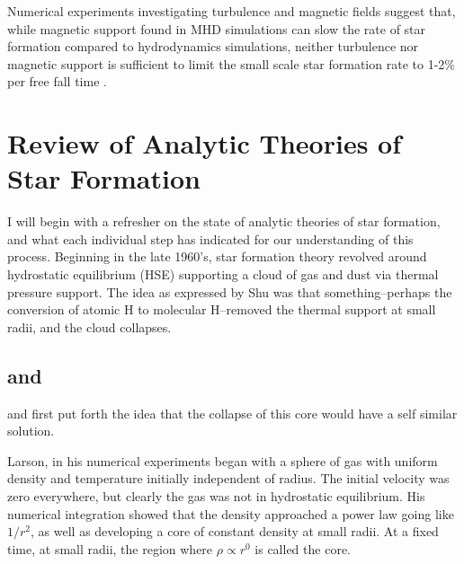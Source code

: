 \documentclass[../dissertation.tex]{subfiles}
\begin{document}

Numerical experiments investigating turbulence and magnetic fields suggest that, while magnetic support found in MHD simulations can slow the rate of star formation 
compared to hydrodynamics simulations, neither turbulence nor magnetic support is sufficient to limit the small scale star formation rate to 1-2\% per free fall time
\citep{2010ApJ...709...27W,2011MNRAS.410L...8C,2011ApJ...730...40P,2012ApJ...754...71K,2014MNRAS.439.3420M,2015ApJ...808...48B,2017ApJ...838...40M}.

\section{Review of Analytic Theories of Star Formation} \label{sec:sf_review}
I will begin with a refresher on the state of analytic theories of star formation, and what each individual step has indicated for our understanding of this process.
Beginning in the late 1960's, star formation theory revolved around hydrostatic equilibrium (HSE) supporting a cloud of gas and dust via thermal pressure support. 
The idea as expressed by Shu was that something--perhaps the conversion of atomic H to molecular H--removed the thermal support at small radii, and the cloud collapses.

\subsection{\citet{1969MNRAS.145..271L} and \citet{1969MNRAS.144..425P}}
\citet{1969MNRAS.145..271L} and \citet{1969MNRAS.144..425P} first put forth the idea that the collapse of this core would have a self similar solution. 

Larson, in his numerical experiments began with a sphere of gas with  uniform density and temperature initially independent of radius. 
The initial velocity was zero everywhere, but clearly the gas was not in hydrostatic equilibrium. His numerical integration showed that the density approached a power law going like $1/r^2$, as well as developing a core of constant density at small radii. At a fixed time, at small radii, the region where $\rho \propto r^0$ is called the core. 
\end{document}
